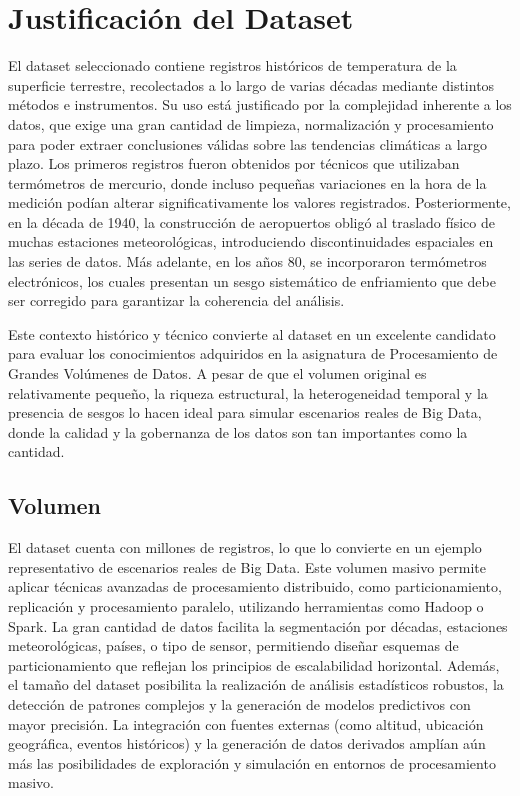 \documentclass[12pt,a4paper]{scrartcl}
\begin{document}
\section{Justificación del Dataset}

El dataset seleccionado contiene registros históricos de temperatura de la superficie terrestre, recolectados a lo largo de varias décadas mediante distintos métodos e instrumentos. Su uso está justificado por la complejidad inherente a los datos, que exige una gran cantidad de limpieza, normalización y procesamiento para poder extraer conclusiones válidas sobre las tendencias climáticas a largo plazo. Los primeros registros fueron obtenidos por técnicos que utilizaban termómetros de mercurio, donde incluso pequeñas variaciones en la hora de la medición podían alterar significativamente los valores registrados. Posteriormente, en la década de 1940, la construcción de aeropuertos obligó al traslado físico de muchas estaciones meteorológicas, introduciendo discontinuidades espaciales en las series de datos. Más adelante, en los años 80, se incorporaron termómetros electrónicos, los cuales presentan un sesgo sistemático de enfriamiento que debe ser corregido para garantizar la coherencia del análisis.

Este contexto histórico y técnico convierte al dataset en un excelente candidato para evaluar los conocimientos adquiridos en la asignatura de Procesamiento de Grandes Volúmenes de Datos. A pesar de que el volumen original es relativamente pequeño, la riqueza estructural, la heterogeneidad temporal y la presencia de sesgos lo hacen ideal para simular escenarios reales de Big Data, donde la calidad y la gobernanza de los datos son tan importantes como la cantidad.

\subsection{Volumen}

El dataset cuenta con millones de registros, lo que lo convierte en un ejemplo representativo de escenarios reales de Big Data. Este volumen masivo permite aplicar técnicas avanzadas de procesamiento distribuido, como particionamiento, replicación y procesamiento paralelo, utilizando herramientas como Hadoop o Spark. La gran cantidad de datos facilita la segmentación por décadas, estaciones meteorológicas, países, o tipo de sensor, permitiendo diseñar esquemas de particionamiento que reflejan los principios de escalabilidad horizontal. Además, el tamaño del dataset posibilita la realización de análisis estadísticos robustos, la detección de patrones complejos y la generación de modelos predictivos con mayor precisión. La integración con fuentes externas (como altitud, ubicación geográfica, eventos históricos) y la generación de datos derivados amplían aún más las posibilidades de exploración y simulación en entornos de procesamiento masivo.
\end{document}
